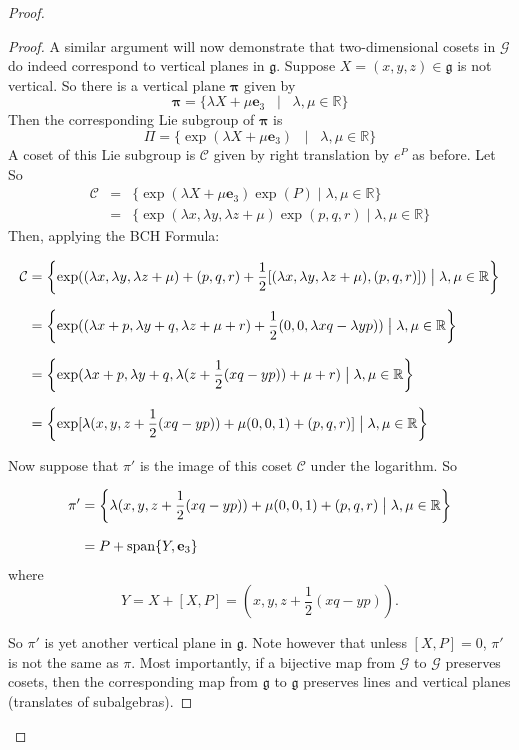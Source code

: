 \documentclass[honours]{UNSWthesis}
\newcommand{\R}{\mathbb{R}}
\newcommand{\G}{\mathcal{G}}
\newcommand{\g}{\mathfrak{g}}
\newcommand{\1}{\mathbf{e}_{1}}
\newcommand{\2}{\mathbf{e}_{3}}
\newcommand{\3}{\mathbf{e}_{3}}
\begin{document}
\begin{proof}
\begin{proof}
A similar argument will now demonstrate that two-dimensional cosets in $\G$ do indeed correspond to vertical planes in $\g$.
Suppose $X=(x,y,z) \in \g$ is not vertical. So there is a vertical plane $\mathbf{\pi}$ given by 
\[
\mathbf{\pi} = \{\lambda X + \mu \3 \;\;\;|\;\;\; \lambda,\mu \in \R \}
\]
Then the corresponding Lie subgroup of $\mathbf{\pi}$ is 
\[
\Pi = \{\exp(\lambda X + \mu \3) \;\;\;|\;\;\; \lambda,\mu \in \R \}
\]
A coset of this Lie subgroup is $\mathcal{C}$ given by right translation by $e^{P}$ as before. Let So 
\begin{eqnarray*}
\mathcal{C} &=& \{\exp(\lambda X + \mu \3)\exp (P) \mid \lambda,\mu \in \R \} \\
&=& \{ \exp(\lambda x, \lambda y, \lambda z +\mu)\exp(p,q,r)\mid \lambda,\mu \in \R \} 
\end{eqnarray*}
Then, applying the BCH Formula:

\begin{align*}
\mathcal{C}&=  \left\lbrace \exp((\lambda x, \lambda y, \lambda z +\mu)+(p,q,r)+\frac{1}{2}[(\lambda x, \lambda y, \lambda z +\mu),(p,q,r)]) \bigm| \lambda,\mu \in \R \right\rbrace \\[0.7em]
&= \left\lbrace \exp ((\lambda x+p, \lambda y+q, \lambda z +\mu +r)+ \frac{1}{2}(0,0,\lambda xq -\lambda yp))\bigm| \lambda,\mu \in \R \right\rbrace \\[0.7em]
&= \left\lbrace \exp (\lambda x+p, \lambda y+q, \lambda (z+\frac{1}{2}(xq-yp)) +\mu +r) \bigm| \lambda,\mu \in \R \right\rbrace \\[0.7em]
&= \left\lbrace \exp [\lambda( x, y, z+\frac{1}{2}(xq-yp))+\mu(0,0,1)+(p,q,r)]\bigm| \lambda,\mu \in \R \right\rbrace
\end{align*}

Now suppose that $\pi'$ is the image of this coset $\mathcal{C}$ under the logarithm. So 

\begin{align*}
\pi' &= \left\lbrace \lambda( x, y, z+\frac{1}{2}(xq-yp))+\mu(0,0,1)+(p,q,r) \bigm| \lambda,\mu \in \R \right\rbrace \\[.7em]
&= P+\text{span}\{Y,\3 \}
\end{align*}
where $$Y=X+[X,P]=( x, y, z+\frac{1}{2}(xq-yp)).$$ 

So $\pi'$ is yet another vertical plane in $\g$. Note however that unless $[X,P]=0$, $\pi'$ is not the same as $\pi$. Most importantly, if a bijective map from $\G$ to $\G$ preserves cosets, then the corresponding map from $\g$ to $\g$ preserves lines and vertical planes (translates of subalgebras).
\end{proof}


\end{proof}
\end{document}
